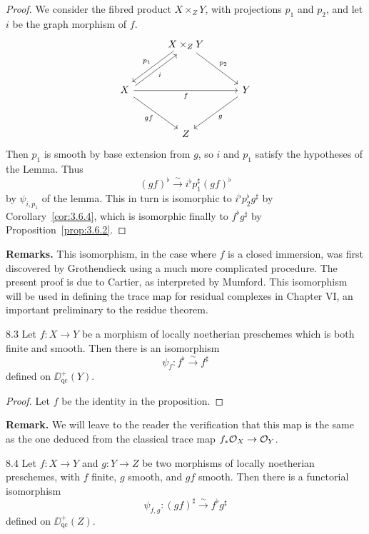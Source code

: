 \begin{proof}
We consider the fibred product $X\times_Z Y$, with projections $p_1$ and $p_2$, and let $i$ be the graph morphism of $f$.
\[
\begin{tikzcd}[row sep=3em, column sep=3em]
	& X \times_Z Y \arrow[dl, "p_1"', shift right] \arrow[dr, "p_2"] & \\
	X \arrow[ur, "i"', shift right] \arrow[rr, "f"'] \arrow[dr, "gf"'] & & Y \arrow[dl, "g"] \\
	& Z &
\end{tikzcd}
\]
Then $p_1$ is smooth by base extension from $g$, so $i$ and $p_1$ satisfy the hypotheses of the Lemma. Thus
\[
(gf)^{\flat} \xrightarrow{\sim} i^{\flat} p_1^{\sharp} (gf)^{\flat}
\]
by $\psi_{i,p_1}$ of the lemma. This in turn is isomorphic to $i^{\flat} p_2^{\flat} g^{\sharp}$ by Corollary~\ref{cor:3.6.4}, which is isomorphic finally to $f^{\flat}g^{\sharp}$ by Proposition~\ref{prop:3.6.2}.
\end{proof}

\textbf{Remarks.}
This isomorphism, in the case where $f$ is a closed immersion, was first discovered by Grothendieck using a much more complicated procedure. The present proof is due to Cartier, as interpreted by Mumford. This isomorphism will be used in defining the trace map for residual complexes in Chapter VI, an important preliminary to the residue theorem.

\begin{bookcorollary}{8.3}\label{cor:3.8.3}
Let $f\colon X\to Y$ be a morphism of locally noetherian preschemes which is both finite and smooth. Then there is an isomorphism
\[
\psi_f \colon f^{\flat} \xrightarrow{\sim} f^{\sharp}
\]
defined on $\DD_{\mathrm{qc}}^+(Y)$.
\end{bookcorollary}

\begin{proof}
Let $f$ be the identity in the proposition.
\end{proof}

\textbf{Remark.}
We will leave to the reader the verification that this map is the same as the one deduced from the classical trace map $f_*\mathcal{O}_X\to\mathcal{O}_Y$.

\begin{bookproposition}{8.4}\label{prop:3.8.4}
Let $f\colon X\to Y$ and $g\colon Y\to Z$ be two morphisms of locally noetherian preschemes, with $f$ finite, $g$ smooth, and $gf$ smooth. Then there is a functorial isomorphism
\[
\psi_{f,g}\colon (gf)^{\sharp} \xrightarrow{\sim} f^{\flat}g^{\sharp}
\]
defined on $\DD_{\mathrm{qc}}^+(Z)$.
\end{bookproposition}

